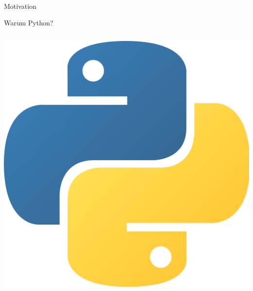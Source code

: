 \begin{frame}[t]{Motivation}
\begin{block}{Warum Python?}
\begin{columns}[onlytextwidth]
\begin{column}{0.2\textwidth}
				\vspace{-0.2cm}
				\includegraphics[width=0.5\linewidth]{picture/python.png}
			\end{column}
		\end{columns}
	\end{block}
\end{frame}
